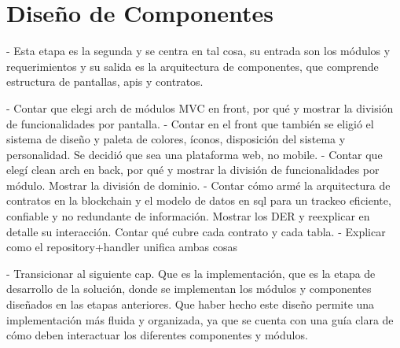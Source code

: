 \section{Diseño de Componentes}
\label{sec:components-design}

- Esta etapa es la segunda y se centra en tal cosa, su entrada son los módulos y requerimientos y su salida es la arquitectura de componentes, que comprende estructura de pantallas, apis y contratos.

- Contar que elegi arch de módulos MVC en front, por qué y mostrar la división de funcionalidades por pantalla.
- Contar en el front que también se eligió el sistema de diseño y paleta de colores, íconos, disposición del sistema y personalidad. Se decidió que sea una plataforma web, no mobile.
- Contar que elegí clean arch en back, por qué y mostrar la división de funcionalidades por módulo. Mostrar la división de dominio.
- Contar cómo armé la arquitectura de contratos en la blockchain y el modelo de datos en sql para un trackeo eficiente, confiable y no redundante de información. Mostrar los DER y reexplicar en detalle su interacción. Contar qué cubre cada contrato y cada tabla.
- Explicar como el repository+handler unifica ambas cosas


- Transicionar al siguiente cap. Que es la implementación, que es la etapa de desarrollo de la solución, donde se implementan los módulos y componentes diseñados en las etapas anteriores. Que haber hecho este diseño permite una implementación más fluida y organizada, ya que se cuenta con una guía clara de cómo deben interactuar los diferentes componentes y módulos.